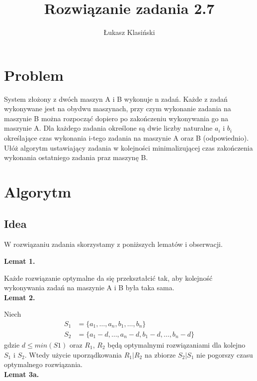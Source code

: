 \documentclass[11pt, wide]{article}
\title{Rozwiązanie zadania 2.7}
\author{Łukasz Klasiński}
\begin{document}
    \maketitle
    
    \tableofcontents
    
    \section{Problem}
    
    System złożony z dwóch maszyn A i B wykonuje n zadań. Każde z zadań wykonywane jest
    na obydwu maszynach, przy czym wykonanie zadania na maszynie B można rozpocząć dopiero
    po zakończeniu wykonywania go na maszynie A. Dla każdego zadania określone są dwie liczby
    naturalne $a_i$ i $b_i$ określające czas wykonania i-tego zadania na maszynie A oraz B (odpowiednio).
    Ułóż algorytm ustawiający zadania w kolejności minimalizującej czas zakończenia wykonania
    ostatniego zadania praz maszynę B.
    
    \section{Algorytm}
    
    \subsection{Idea}
    
    W rozwiązaniu zadania skorzystamy z poniższych lematów i obserwacji.


    \textbf{Lemat 1.}

    Każde rozwiązanie optymalne da się przekształcić tak, aby kolejność
    wykonywania zadań na maszynie A i B była taka sama.
    \\


    \textbf{Lemat 2.}

    Niech 
    \begin{align*}
    S_1 &= \{ a_1, \ldots, a_n, b_1, \ldots, b_n \} \\
    S_2 &= \{ a_1 - d, \ldots, a_n - d, b_1 - d, \ldots, b_n - d \}   
    \end{align*}
    gdzie $d \leq min(S1) $
    oraz $R_1$, $R_2$ będą optymalnymi rozwiązaniami dla kolejno $S_1$ i $S_2$.
    Wtedy użycie uporządkowania $R_1|R_2$ na zbiorze $S_2|S_1$ nie pogorszy czasu optymalnego rozwiązania.
    \\

    \textbf{Lemat 3a.}
\end{document}

